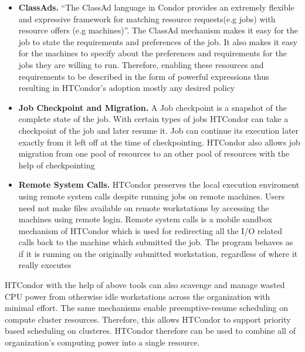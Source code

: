 \documentclass[9pt,twocolumn,twoside]{styles/osajnl}
\newcommand{\TODO}[2][]{\todo[color=red!10,inline,#1]{#2}}
\newcommand{\GE}{\TODO{Grammar}}
\begin{document}
\begin{itemize}

\item {\bf ClassAds.} ``The ClassAd language in Condor provides an
  extremely flexible and expressive framework for matching resource
  requests(e.g jobs) with resource offers (e.g
  machines)''\cite{condor-practice}.  The ClassAd mechanism makes it
  easy for the job to state the requirements and preferences of the
  job. It also makes it easy for the machines to specify about the
  preferences and requirements for the jobs they are willing to run.
  Therefore, enabling these resources and requirements to be described
  in the form of powerful expressions thus resulting in HTCondor's
  adoption mostly any desired policy\cite{condor-practice}
  
\item {\bf Job Checkpoint and Migration.} A Job checkpoint is a
  snapshot of the complete state of the
  job\cite{Checkpoint_Migration_techreport_1997}. With certain types
  of jobs HTCondor can take a checkpoint of the job and later resume
  it. Job can continue its execution later exactly from it left off at
  the time of checkpointing. HTCondor also allows job migration from
  one pool of resources to an other pool of resources with the help of
  checkpointing\cite{beowulfbook-condor}
  \TODO{\GE
    Check Grammar. (Singular/plural is/are)
  }
\item {\bf Remote System Calls.} HTCondor preserves the local
  execution enviroment using remote system calls despite running jobs
  on remote machines. Users need not make files available on remote
  workstations by accessing the machines using remote login. Remote
  system calls is a mobile sandbox mechanism of HTCondor which is used
  for redirecting all the I/O related calls back to the machine which
  submitted the job. The program behaves as if it is running on the
  originally submitted workstation, regardless of where it really
  executes\cite{condor-practice}
  
\end{itemize}

HTCondor with the help of above tools can also scavenge and manage
wasted CPU power from otherwise idle workstations across the
organization with minimal effort\cite{condor-hunter}. The same
mechanisms enable preemptive-resume scheduling on compute cluster
resources. Therefore, this allows HTCondor to support priority based
scheduling on clusteres. HTCondor therefore can be used to combine all
of organization's computing power into a single resource.
\end{document}
